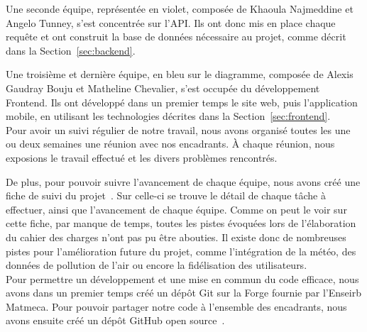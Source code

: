 \noindent Une seconde équipe, représentée en violet, composée de Khaoula Najmeddine et Angelo Tunney, s'est concentrée sur l'API.
Ils ont donc mis en place chaque requête et ont construit la base de données nécessaire au projet, comme décrit dans la Section~\ref{sec:backend}.

\noindent Une troisième et dernière équipe, en bleu sur le diagramme, composée de Alexis Gaudray Bouju et Matheline Chevalier, s'est occupée du développement Frontend.
Ils ont développé dans un premier temps le site web, puis l'application mobile, en utilisant les technologies décrites dans la Section~\ref{sec:frontend}.\\

\noindent Pour avoir un suivi régulier de notre travail, nous avons organisé toutes les une ou deux semaines une réunion avec nos encadrants.
À chaque réunion, nous exposions le travail effectué et les divers problèmes rencontrés.

\noindent De plus, pour pouvoir suivre l'avancement de chaque équipe, nous avons créé une fiche de suivi du projet~\cite{ficheSuivi}.
Sur celle-ci se trouve le détail de chaque tâche à effectuer, ainsi que l'avancement de chaque équipe.
Comme on peut le voir sur cette fiche, par manque de temps, toutes les pistes évoquées lors de l'élaboration du cahier des charges n'ont pas pu être abouties.
Il existe donc de nombreuses pistes pour l'amélioration future du projet, comme l'intégration de la météo, des données de pollution de l'air ou encore la fidélisation des utilisateurs.\\

\noindent Pour permettre un développement et une mise en commun du code efficace, nous avons dans un premier temps créé un dépôt Git sur la Forge fournie par l'Enseirb Matmeca.
Pour pouvoir partager notre code à l'ensemble des encadrants, nous avons ensuite créé un dépôt GitHub open source~\cite{GitHub}.